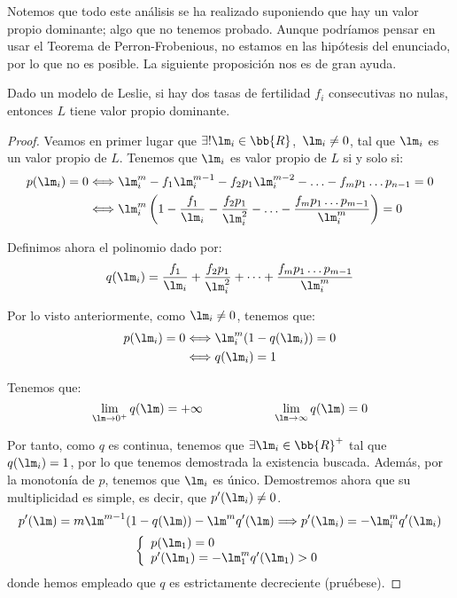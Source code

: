 Notemos que todo este análisis se ha realizado suponiendo que hay un valor propio dominante; algo que no tenemos probado. Aunque podríamos pensar en usar el Teorema de Perron-Frobenious, no estamos en las hipótesis del enunciado, por lo que no es posible. La siguiente proposición nos es de gran ayuda.
\begin{prop}
    Dado un modelo de Leslie,
    si hay dos tasas de fertilidad $f_i$ consecutivas no nulas, entonces $L$ tiene valor propio dominante.
    \begin{proof}
    Veamos en primer lugar que $\exists !\lm_i\in \bb{R}$,~$\lm_i\neq 0$, tal que $\lm_i$ es un valor propio de $L$. Tenemos que $\lm_i$ es valor propio de $L$ si y solo si:
    \begin{align*}
        p(\lm_i) = 0 &\Longleftrightarrow \lm_i^m - f_1 \lm_i^{m-1} - f_2p_1\lm_i^{m-2} - \ldots - f_m p_1 \ldots p_{n-1} = 0 \\
        &\Longleftrightarrow \lm_i^m \left(1 - \dfrac{f_1}{\lm_i} - \dfrac{f_2p_1}{\lm_i^2} - \ldots - \dfrac{f_mp_1\ldots p_{m-1}}{\lm_i^m}\right) = 0
    \end{align*}
    
    Definimos ahora el polinomio dado por:
    \begin{equation*}
        q(\lm_i) = \dfrac{f_1}{\lm_i} + \dfrac{f_2p_1}{\lm_i^2} + \cdots + \dfrac{f_mp_1\ldots p_{m-1}}{\lm_i^m}
    \end{equation*}

    Por lo visto anteriormente, como $\lm_i\neq 0$, tenemos que:
    \begin{align*}
        p(\lm_i) = 0 &\Longleftrightarrow  \lm_i^m (1-q(\lm_i)) = 0 \\
        &\Longleftrightarrow q(\lm_i) = 1
    \end{align*}

    Tenemos que:
    \begin{equation*}
        \lim_{\lm\to 0^+}q(\lm) = +\infty
        \hspace{2cm}
        \lim_{\lm\to \infty}q(\lm) = 0
    \end{equation*}

    Por tanto, como $q$ es continua, tenemos que $\exists \lm_i\in \bb{R}^+$ tal que $q(\lm_i)=1$, por lo que tenemos demostrada la existencia buscada.
    Además, por la monotonía de $p$, tenemos que $\lm_i$ es único.
    Demostremos ahora que su multiplicidad es simple, es decir, que $p'(\lm_i)\neq 0$.
    \begin{equation*}
        p'(\lm) = m\lm^{m-1} (1-q(\lm)) - \lm^m q'(\lm)
        \Longrightarrow p'(\lm_i) = -\lm^m_i q'(\lm_i)
    \end{equation*}
    \begin{equation*}
        \left\{ \begin{array}{l}
            p(\lm_1) = 0 \\
            p'(\lm_1) = -\lm^m_1 q'(\lm_1) >0
        \end{array}\right.
    \end{equation*}
    donde hemos empleado que $q$ es estrictamente decreciente (pruébese).



\end{proof}
\end{prop}
